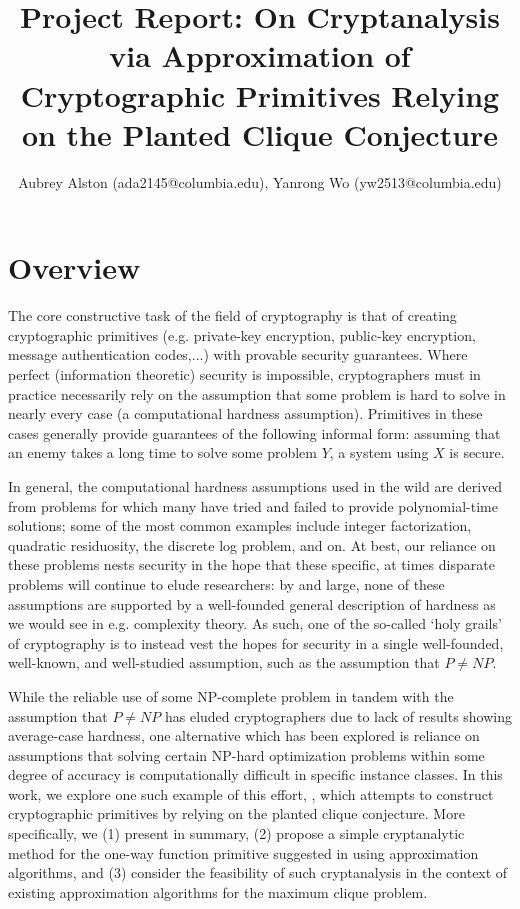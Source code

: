 \documentclass{article}
\title{Project Report: On Cryptanalysis via Approximation of Cryptographic 
Primitives Relying on the Planted Clique Conjecture}
\author{Aubrey Alston (ada2145@columbia.edu), Yanrong Wo (yw2513@columbia.edu)}
\date{}
\theoremstyle{definition}
\begin{document}
\maketitle

\section{Overview}

The core constructive task of the field 
of cryptography is that of creating cryptographic primitives (e.g. private-key encryption,
public-key encryption, message authentication codes,...) with provable security guarantees.
Where perfect (information theoretic) security is impossible, cryptographers must in practice necessarily rely on the assumption that some problem is hard to solve in nearly every 
case (a computational hardness assumption).  Primitives in these cases generally provide 
guarantees of the following informal form:
assuming that an enemy takes a long time to solve some problem $Y$, 
a system using $X$ is secure.

In general, the computational hardness assumptions used in the wild are derived 
from problems for which many have tried and failed to provide polynomial-time solutions; 
some of the most common examples include integer factorization, quadratic residuosity, 
the discrete log problem, and on.  At best, our reliance on these problems nests security 
in the hope that these specific, at times disparate problems will continue to elude 
researchers: by and large, none of these assumptions are supported by a well-founded 
general description of hardness as we would see in e.g. complexity theory.  As such, one of the so-called `holy grails' of cryptography is to 
instead vest the hopes for security in a single well-founded, well-known, and well-studied 
assumption, such as the assumption that $P \neq NP$.

While the reliable use of some NP-complete problem in tandem with the assumption that 
$P \neq NP$ has eluded cryptographers due to lack of results showing average-case hardness, 
one alternative which has been explored is reliance on assumptions that solving 
certain NP-hard optimization problems within some degree of accuracy 
is computationally difficult in specific instance 
classes.  In this work, we explore one such example of this effort, 
\cite{HidingCliques}, which attempts to construct cryptographic primitives by relying on the planted clique conjecture.  More specifically, we (1) present \cite{HidingCliques} in summary, 
(2) propose a simple cryptanalytic method for the one-way function primitive suggested in \cite{HidingCliques} 
using approximation algorithms, and (3) consider the feasibility of such cryptanalysis 
in the context of existing approximation algorithms for the maximum clique problem.
\tableofcontents
\end{document}
